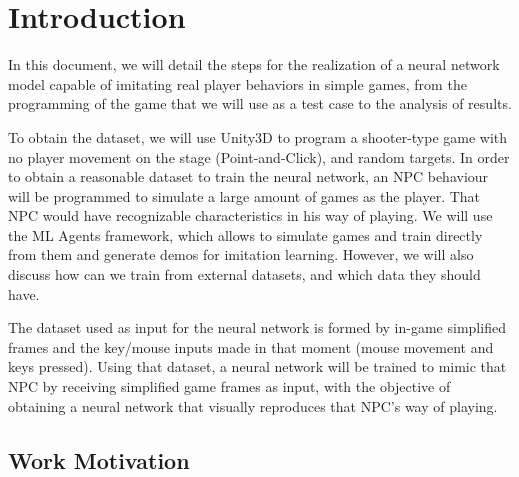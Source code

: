 %
%
%

\chapter{Introduction}

\minitoc{}

\bigskip{}

In this document, we will detail the steps for the realization of a neural network model capable of imitating real player behaviors in simple games, from the programming of the game that we will use as a test case to the analysis of results.

To obtain the dataset, we will use Unity3D to program a shooter-type game with no player movement on the stage (Point-and-Click), and random targets. In order to obtain a reasonable dataset to train the neural network, an NPC behaviour will be programmed to simulate a large amount of games as the player. That NPC would have recognizable characteristics in his way of playing. We will use the ML Agents framework, which allows to simulate games and train directly from them and generate demos for imitation learning. However, we will also discuss how can we train from external datasets, and which data they should have.

The dataset used as input for the neural network is formed by in-game simplified frames and the key/mouse inputs made in that moment (mouse movement and keys pressed). Using that dataset, a neural network will be trained to mimic that NPC by receiving simplified game frames as input, with the objective of obtaining a neural network that visually reproduces that NPC’s way of playing.


\section{Work Motivation}

